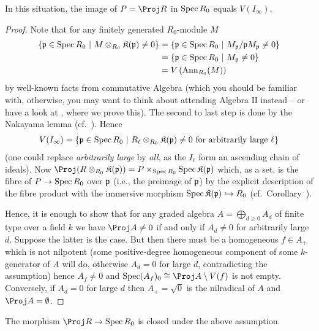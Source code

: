 \documentclass[a4paper,parskip=half,numbers=enddot, DIV=12]{scrreprt}
\begin{document}
\begin{prop}
    In this situation, the image of $P=\Proj R$ in $\operatorname{Spec} R_0$ equals $V(I_\infty)$.
\end{prop}
\begin{proof}
    Note that for any finitely generated $R_0$-module $M$ 
    \begin{align*}
        \left\{\mathfrak{p}\in \operatorname{Spec} R_0\ \middle|\  M\otimes_{R_0}\mathfrak{K}(\mathfrak{p})\neq 0\right\} &= \left\{\mathfrak{p}\in \operatorname{Spec} R_0 \ \middle|\  M_{\mathfrak{p}}/\mathfrak{p} M_{\mathfrak{p}} \neq 0\right\}\\
        &= \left\{\mathfrak{p}\in \operatorname{Spec} R_0\ \middle|\  M_{\mathfrak{p}}\neq 0\right\}\\
        &= V\left(\operatorname{Ann}_{R_0}(M)\right)
    \end{align*}
    by well-known facts from commutative Algebra (which you should be familiar with, otherwise, you may want to think about attending Algebra $\mathrm{II}$ instead -- or have a look at \cite[Lemma~3.4.1]{alg2}, where we prove this). The second to last step is done by the Nakayama lemma (cf.\ \cite[Proposition~1.2.3]{alg2}). Hence 
    \begin{align*}
        V(I_\infty) = \left\{\mathfrak{p}\in \operatorname{Spec} R_0\ \middle|\  R_\ell\otimes_{R_0} \mathfrak{K}(\mathfrak{p})\neq 0 \text{ for arbitrarily large } \ell\right\}
    \end{align*}
    (one could replace \emph{arbitrarily large} by \emph{all}, as the $I_\ell$ form an ascending chain of ideals). Now $\Proj(R\otimes_{R_0} \KK(\pp)) = P\times_{\Spec R_0} \Spec\KK(\pp)$ which, as a set, is the fibre of $P\morphism \Spec R_0$ over $\mathfrak{p}$ (i.e., the preimage of $\mathfrak{p}$) by the explicit description of the fibre product with the immersive morphism $\Spec \KK(\pp) \monomorphism R_0$ (cf.\ Corollary~). 
    
    Hence, it is enough to show that for any graded algebra $A=\bigoplus_{d\geq 0}A_d$ of finite type over a field $k$ we have $\Proj A\neq 0$ if and only if $A_d \neq 0$ for arbitrarily large $d$. Suppose the latter is the case. But then there must be a homogeneous $f\in A_+$ which is not nilpotent (some positive-degree homogeneous component of some $k$-generator of $A$ will do, otherwise $A_d=0$ for large $d$, contradicting the assumption) hence $A_f \neq 0$ and $\Spec(A_f)_0 \cong \Proj A\setminus V(f)$ is not empty. Conversely, if $A_d = 0$ for large $d$ then $A_+ = \sqrt{0}$ is the nilradical of $A$ and $\Proj A = \emptyset$.
\end{proof}
\begin{cor}
    The morphism $\Proj R \morphism \Spec R_0$ is closed under the above assumption.
\end{cor}
\end{document}
